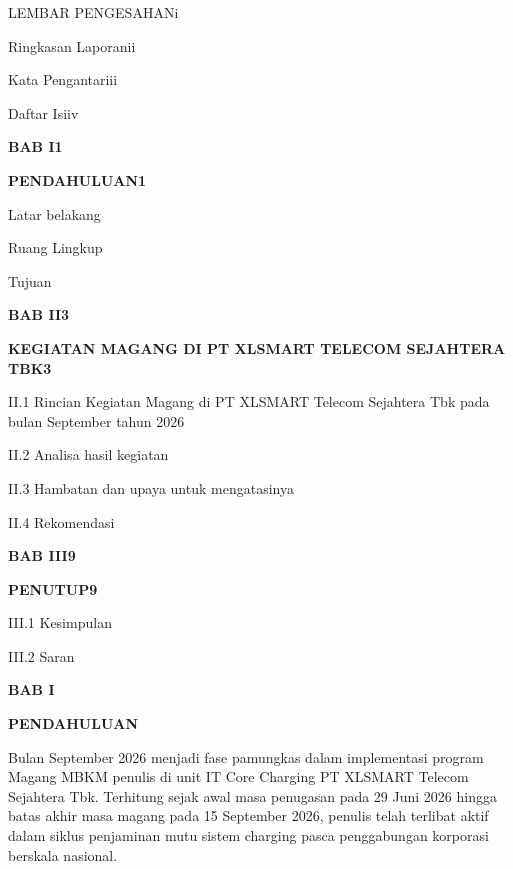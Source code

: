 \documentclass[12pt,a4paper]{article}
\begin{document}
\noindent LEMBAR PENGESAHAN\dotfill i\par
\noindent Ringkasan Laporan\dotfill ii\par
\noindent Kata Pengantar\dotfill iii\par
\noindent Daftar Isi\dotfill iv\par
\noindent\textbf{BAB I}\dotfill \textbf{1}\par
\noindent\textbf{PENDAHULUAN}\dotfill \textbf{1}\par
{} Latar belakang\par
{} Ruang Lingkup\par
{} Tujuan\par
\noindent\textbf{BAB II}\dotfill \textbf{3}\par
\noindent\textbf{KEGIATAN MAGANG DI PT XLSMART TELECOM SEJAHTERA TBK}\dotfill \textbf{3}\par
\noindent II.1 Rincian Kegiatan Magang di PT XLSMART Telecom Sejahtera Tbk pada bulan September tahun 2026\par
\noindent II.2 Analisa hasil kegiatan\par
\noindent II.3 Hambatan dan upaya untuk mengatasinya\par
\noindent II.4 Rekomendasi\par
\noindent\textbf{BAB III}\dotfill \textbf{9}\par
\noindent\textbf{PENUTUP}\dotfill \textbf{9}\par
\noindent III.1 Kesimpulan\par
\noindent III.2 Saran\par

\clearpage
{}
\setcounter{page}{1}

\begin{center}
    {\bfseries\large BAB I\par}
    {\bfseries\large PENDAHULUAN\par}
\end{center}
\vspace{0.3cm}

Bulan September 2026 menjadi fase pamungkas dalam implementasi program Magang MBKM penulis di unit IT Core Charging PT XLSMART Telecom Sejahtera Tbk. Terhitung sejak awal masa penugasan pada 29 Juni 2026 hingga batas akhir masa magang pada 15 September 2026, penulis telah terlibat aktif dalam siklus penjaminan mutu sistem charging pasca penggabungan korporasi berskala nasional.
\end{document}

